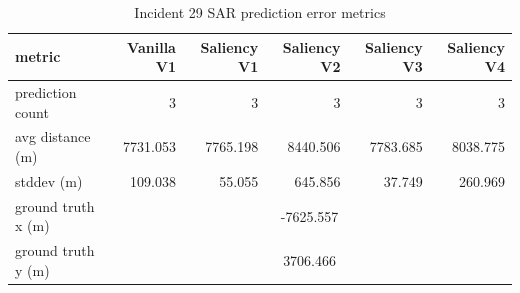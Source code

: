\begin{table}[ht]
\centering
\caption{Incident 29 SAR prediction error metrics}
\label{tab:sar-incident-29}
\begin{tabular}{lrrrrr}
\hline
metric & Vanilla V1 & Saliency V1 & Saliency V2 & Saliency V3 & Saliency V4 \\
\hline
prediction count & 3 & 3 & 3 & 3 & 3 \\
avg distance (m) & 7731.053 & 7765.198 & 8440.506 & 7783.685 & 8038.775 \\
stddev (m) & 109.038 & 55.055 & 645.856 & 37.749 & 260.969 \\
ground truth x (m) & \multicolumn{5}{c}{-7625.557} \\
ground truth y (m) & \multicolumn{5}{c}{3706.466} \\
\hline
\end{tabular}
\end{table}
